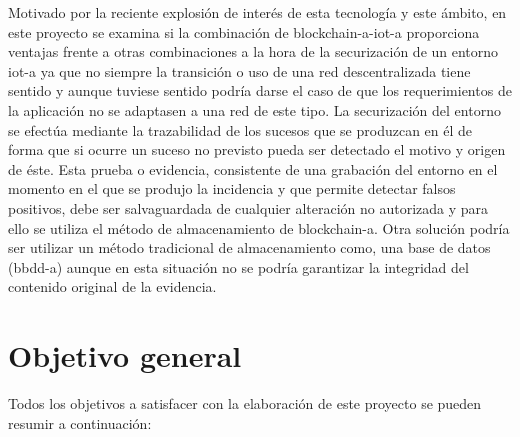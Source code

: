 \documentclass[12pt,a4paper, twoside]{report}
\begin{document}
	Motivado por la reciente explosión de interés de esta tecnología y este ámbito, en este proyecto se examina si la combinación de \gls{blockchain-a}-\gls{iot-a} proporciona ventajas frente a otras combinaciones a la hora de la securización de un entorno \gls{iot-a} ya que no siempre la transición o uso de una red descentralizada tiene sentido y aunque tuviese sentido podría darse el caso de que los requerimientos de la aplicación no se adaptasen a una red de este tipo. La securización del entorno se efectúa mediante la trazabilidad de los sucesos que se produzcan en él de forma que si ocurre un suceso no previsto pueda ser detectado el motivo y origen de éste. Esta prueba o evidencia, consistente de una grabación del entorno en el momento en el que se produjo la incidencia y que permite detectar falsos positivos, debe ser salvaguardada de cualquier alteración no autorizada y para ello se utiliza el método de almacenamiento de \gls{blockchain-a}. Otra solución podría ser utilizar un método tradicional de almacenamiento como, una base de datos (\gls{bbdd-a}) aunque en esta situación no se podría garantizar la integridad del contenido original de la evidencia.
	
	\section{Objetivo general}

	Todos los objetivos a satisfacer con la elaboración de este proyecto se pueden resumir a continuación: 
	
\end{document}
